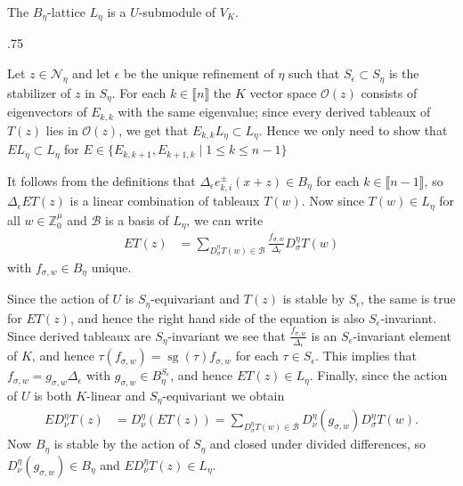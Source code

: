 \documentclass[11pt,fleqn]{article}
\makeatletter
\renewenvironment{proof}[1][\textit{Proof}]{\par
  \pushQED{\qed}%
  \normalfont \topsep.75\paraskip\relax
  \trivlist
  \item[\hskip\labelsep
        \itshape
    #1\@addpunct{.}]\ignorespaces
}{%
  \popQED\endtrivlist\@endpefalse
}
\newcommand\ZZ{\mathbb Z}
\newcommand\N{\mathcal N}
\renewcommand\O{\mathcal O}
\newcommand\interval[1]{\llbracket #1 \rrbracket}
\DeclareMathOperator\sg{sg}
\makeatother
\begin{document}
\begin{Theorem}
The $B_\eta$-lattice $L_\eta$ is a $U$-submodule of $V_K$.
\end{Theorem}
\begin{proof}
Let $z \in \N_\eta$ and let $\epsilon$ be the unique refinement of $\eta$ such 
that $S_\epsilon \subset S_\eta$ is the stabilizer of $z$ in $S_\eta$. For 
each $k \in \interval{n}$ the $K$ vector space $\O(z)$ consists of 
eigenvectors of $E_{k,k}$ with the same eigenvalue; since every derived 
tableaux of $T(z)$ lies in $\O(z)$, we get that $E_{k,k} L_\eta \subset 
L_\eta$. Hence we only need to show that $E L_\eta \subset L_\eta$ for $E \in 
\{E_{k,k+1}, E_{k+1,k} \mid 1 \leq k \leq n-1\}$

It follows from the definitions that $\Delta_\epsilon e_{k,i}^\pm(x+z) \in 
B_\eta$ for each $k \in \interval{n-1}$, so $\Delta_\epsilon E T(z)$ is a 
linear combination of tableaux $T(w)$. Now since $T(w) \in L_\eta$ for all $w 
\in \ZZ^\mu_0$ and $\mathcal B$ is a basis of $L_\eta$, we can write
\begin{align*}
E T(z)
  &= \sum_{D_\sigma^\eta T(w) \in \mathcal B} 
    \frac{f_{\sigma,w}}{\Delta_\epsilon} D_\sigma^\eta T(w)
\end{align*}
with $f_{\sigma,w} \in B_\eta$ unique. 

Since the action of $U$ is $S_\eta$-equivariant and $T(z)$ is stable by
$S_\epsilon$, the same is true for $E T(z)$, and hence the right hand side of
the equation is also $S_\epsilon$-invariant. Since derived tableaux are 
$S_\eta$-invariant we see that $\frac{f_{\sigma,w}}{\Delta_\epsilon}$ is an
$S_\epsilon$-invariant element of $K$, and hence $\tau(f_{\sigma,w}) = 
\sg(\tau) f_{\sigma,w}$ for each $\tau \in S_\epsilon$. This implies that
$f_{\sigma,w} = g_{\sigma,w} \Delta_\epsilon$ with $g_{\sigma,w} \in 
B_\eta^{S_\epsilon}$, and hence $E T(z) \in L_\eta$. Finally, since the action
of $U$ is both $K$-linear and $S_\eta$-equivariant we obtain 
\begin{align*}
E D_\nu^\eta T(z)
  &= D_\nu^\eta (ET(z))
  = \sum_{D_\sigma^\eta T(w) \in \mathcal B} 
    D_\nu^\eta(g_{\sigma, w}) D_\sigma^\eta T(w).
\end{align*}
Now $B_\eta$ is stable by the action of $S_\eta$ and closed under divided 
differences, so $D_\nu^\eta(g_{\sigma, w}) \in B_\eta$ and $E D_\nu^\eta 
T(z) \in L_\eta$.
\end{proof}
\end{document}
